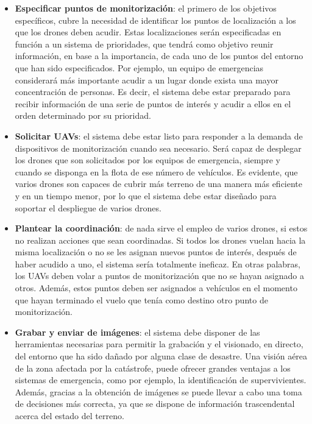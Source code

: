 \begin{itemize}
\item \textbf{Especificar puntos de monitorización}: el primero de los objetivos específicos, cubre la necesidad de identificar los puntos de localización a los que los drones deben acudir. Estas localizaciones serán especificadas en función a un sistema de prioridades, que tendrá como objetivo reunir información, en base a la importancia, de cada uno de los puntos del entorno que han sido especificados. Por ejemplo, un equipo de emergencias considerará más importante acudir a un lugar donde exista una mayor concentración de personas. Es decir, el sistema debe estar preparado para recibir información de una serie de puntos de interés y acudir a ellos en el orden determinado por su prioridad.
\clearpage
\item \textbf{Solicitar \acs{UAV}s}: el sistema debe estar listo para responder a la demanda de dispositivos de monitorización cuando sea necesario. Será capaz de desplegar los drones que son solicitados por los equipos de emergencia, siempre y cuando se disponga en la flota de ese número de vehículos. Es evidente, que varios drones son capaces de cubrir más terreno de una manera más eficiente y en un tiempo menor, por lo que el sistema debe estar diseñado para soportar el despliegue de varios drones.

\item \textbf{Plantear la coordinación}: de nada sirve el empleo de varios drones, si estos no realizan acciones que sean coordinadas. Si todos los drones vuelan hacia la misma localización o no se les asignan nuevos puntos de interés, después de haber acudido a uno, el sistema sería totalmente ineficaz. En otras palabras, los \acs{UAV}s deben volar a puntos de monitorización que no se hayan asignado a otros. Además, estos puntos deben ser asignados a vehículos en el momento que hayan terminado el vuelo que tenía como destino otro punto de monitorización. 

\item \textbf{Grabar y enviar de imágenes}: el sistema debe disponer de las herramientas necesarias para permitir la grabación y el visionado, en directo, del entorno que ha sido dañado por alguna clase de desastre. Una visión aérea de la zona afectada por la catástrofe, puede ofrecer grandes ventajas a los sistemas de emergencia, como por ejemplo, la identificación de supervivientes. Además, gracias a la obtención de imágenes se puede llevar a cabo una toma de decisiones más correcta, ya que se dispone de información trascendental acerca del estado del terreno.


\end{itemize}
